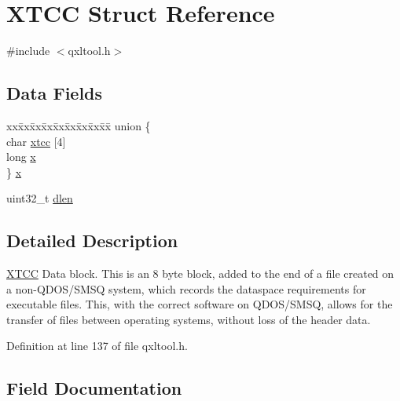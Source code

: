 \hypertarget{struct_x_t_c_c}{}\section{X\+T\+CC Struct Reference}
\label{struct_x_t_c_c}


{\ttfamily \#include $<$qxltool.\+h$>$}

\subsection*{Data Fields}
\begin{DoxyCompactItemize}
\item 
\begin{tabbing}
xx\=xx\=xx\=xx\=xx\=xx\=xx\=xx\=xx\=\kill
union \{\\
\>char \hyperlink{struct_x_t_c_c_acd9081c4e246dfc8ecf272a9ccb10624}{xtcc} \mbox{[}4\mbox{]}\\
\>long \hyperlink{struct_x_t_c_c_a3162ada50d1df39e0f0555ea3d60dea1}{x}\\
\} \hyperlink{struct_x_t_c_c_ac3cd33d0da064be57dbfdfe529905ff2}{x}\\

\end{tabbing}\item 
uint32\+\_\+t \hyperlink{struct_x_t_c_c_a980b74c86756f84742ba39d62d733e25}{dlen}
\end{DoxyCompactItemize}


\subsection{Detailed Description}
\hyperlink{struct_x_t_c_c}{X\+T\+CC} Data block. This is an 8 byte block, added to the end of a file created on a non-\/\+Q\+D\+O\+S/\+S\+M\+SQ system, which records the dataspace requirements for executable files. This, with the correct software on Q\+D\+O\+S/\+S\+M\+SQ, allows for the transfer of files between operating systems, without loss of the header data. 

Definition at line 137 of file qxltool.\+h.



\subsection{Field Documentation}
\mbox{\label{struct_x_t_c_c_a980b74c86756f84742ba39d62d733e25}} 
